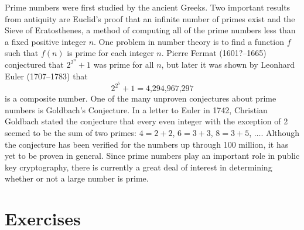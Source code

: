\histhead

\noindent
\parbox{\textwidth}
{\small \histf
Prime numbers were first studied by the ancient Greeks.  Two important results from antiquity are Euclid's proof that an infinite number of primes exist and the Sieve of Eratosthenes, a method of computing all of the prime numbers less than a fixed positive integer $n$.  One problem in number theory is to find a function $f$ such that $f(n)$ is prime for each integer $n$. Pierre Fermat (1601?--1665) conjectured that $2^{2^n} + 1$ was prime for all $n$, but later it was shown by Leonhard Euler (1707--1783) that 
$$
2^{2^5} + 1 = \mbox{4,294,967,297}
$$
is a composite number. One of the many unproven conjectures about prime numbers is Goldbach's Conjecture.  In a letter to Euler in 1742, Christian Goldbach stated the conjecture that every even integer with the exception of 2 seemed to be the sum of two primes:  $4 = 2 + 2$, $6 = 3 + 3$, $8 =3 + 5$, $\ldots$.  Although the conjecture has been verified for the numbers up through 100 million, it has yet to be proven in general.  Since prime numbers play an important role in public key cryptography, there is currently a great deal of interest in determining whether or not a large number is prime.
\histbox
}


\section*{Exercises}
\exrule

